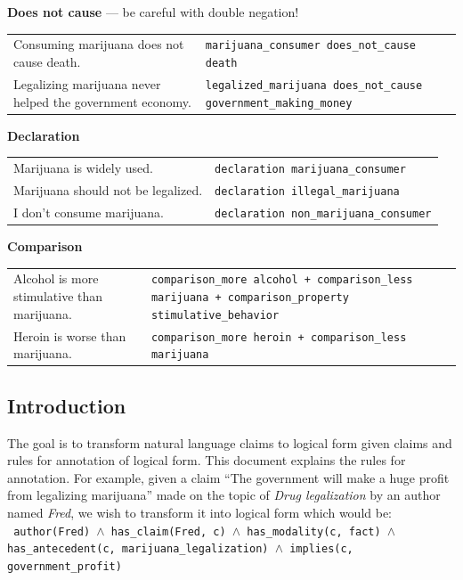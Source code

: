 \noindent \textbf{Does not cause} --- be careful with double negation! \\
\begin{tabular}{p{8cm} p{8cm}}
	Consuming marijuana does not cause death. & \texttt{marijuana\_consumer does\_not\_cause death} \\
	Legalizing marijuana never helped the government economy. & \texttt{legalized\_marijuana does\_not\_cause government\_making\_money}
\end{tabular}

\noindent \textbf{Declaration} \\
\begin{tabular}{p{8cm} p{8cm}}
	Marijuana is widely used. & \texttt{declaration marijuana\_consumer}  \\
	Marijuana should not be legalized. & \texttt{declaration illegal\_marijuana} \\
	I don’t consume marijuana.  & \texttt{declaration non\_marijuana\_consumer}
\end{tabular}

\noindent \textbf{Comparison} \\
\begin{tabular}{p{8cm} p{8cm}}
	Alcohol is more stimulative than marijuana. & \texttt{comparison\_more alcohol + comparison\_less marijuana + comparison\_property stimulative\_behavior}\\
	Heroin is worse than marijuana. & \texttt{comparison\_more heroin + comparison\_less marijuana}
\end{tabular}

\subsection*{Introduction}

The goal is to transform natural language claims to logical form given claims
and rules for annotation of logical form. This document explains the rules for
annotation. For example, given a claim ``The government will make a huge profit
from legalizing marijuana'' made on the topic of \textit{Drug legalization} by an author
named \textit{Fred}, we wish to transform it into logical form which would be: \\

\noindent \texttt{
author(Fred) $\wedge$ has\_claim(Fred, c) $\wedge$ has\_modality(c, fact) 
$\wedge$ has\_antecedent(c, marijuana\_legalization) 
$\wedge$ implies(c, government\_profit)
} \\

